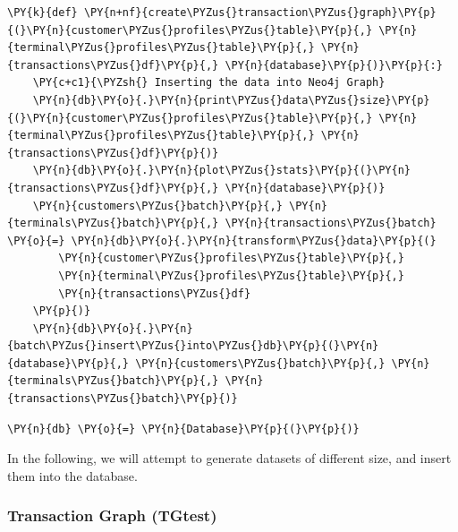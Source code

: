     \begin{tcolorbox}[breakable, size=fbox, boxrule=1pt, pad at break*=1mm,colback=cellbackground, colframe=cellborder]
\begin{Verbatim}[commandchars=\\\{\}]
\PY{k}{def} \PY{n+nf}{create\PYZus{}transaction\PYZus{}graph}\PY{p}{(}\PY{n}{customer\PYZus{}profiles\PYZus{}table}\PY{p}{,} \PY{n}{terminal\PYZus{}profiles\PYZus{}table}\PY{p}{,} \PY{n}{transactions\PYZus{}df}\PY{p}{,} \PY{n}{database}\PY{p}{)}\PY{p}{:}
    \PY{c+c1}{\PYZsh{} Inserting the data into Neo4j Graph}
    \PY{n}{db}\PY{o}{.}\PY{n}{print\PYZus{}data\PYZus{}size}\PY{p}{(}\PY{n}{customer\PYZus{}profiles\PYZus{}table}\PY{p}{,} \PY{n}{terminal\PYZus{}profiles\PYZus{}table}\PY{p}{,} \PY{n}{transactions\PYZus{}df}\PY{p}{)}
    \PY{n}{db}\PY{o}{.}\PY{n}{plot\PYZus{}stats}\PY{p}{(}\PY{n}{transactions\PYZus{}df}\PY{p}{,} \PY{n}{database}\PY{p}{)}
    \PY{n}{customers\PYZus{}batch}\PY{p}{,} \PY{n}{terminals\PYZus{}batch}\PY{p}{,} \PY{n}{transactions\PYZus{}batch} \PY{o}{=} \PY{n}{db}\PY{o}{.}\PY{n}{transform\PYZus{}data}\PY{p}{(}
        \PY{n}{customer\PYZus{}profiles\PYZus{}table}\PY{p}{,}
        \PY{n}{terminal\PYZus{}profiles\PYZus{}table}\PY{p}{,}
        \PY{n}{transactions\PYZus{}df}
    \PY{p}{)}
    \PY{n}{db}\PY{o}{.}\PY{n}{batch\PYZus{}insert\PYZus{}into\PYZus{}db}\PY{p}{(}\PY{n}{database}\PY{p}{,} \PY{n}{customers\PYZus{}batch}\PY{p}{,} \PY{n}{terminals\PYZus{}batch}\PY{p}{,} \PY{n}{transactions\PYZus{}batch}\PY{p}{)}
\end{Verbatim}
\end{tcolorbox}

    \begin{tcolorbox}[breakable, size=fbox, boxrule=1pt, pad at break*=1mm,colback=cellbackground, colframe=cellborder]
\begin{Verbatim}[commandchars=\\\{\}]
\PY{n}{db} \PY{o}{=} \PY{n}{Database}\PY{p}{(}\PY{p}{)}
\end{Verbatim}
\end{tcolorbox}

    In the following, we will attempt to generate datasets of different
size, and insert them into the database.

    \hypertarget{transaction-graph-tgtest}{%
\subsubsection{Transaction Graph
(TGtest)}\label{transaction-graph-tgtest}}

